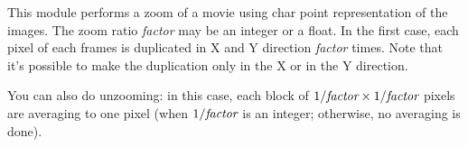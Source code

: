 This module performs a zoom of a movie using char point representation of
the images.
The zoom ratio {\em factor} may be an integer or a float.
In the first case, each pixel of each frames
is duplicated in X and Y direction {\em factor} times.
Note that it's possible to make the duplication only in the X or in the Y
direction.

You can also do unzooming: in this case, each block of $1/\mbox{\em factor} \times 1/\mbox{\em factor}$ pixels are averaging to one pixel (when $1/\mbox{\em factor}$ is an integer; otherwise, no averaging is done).



